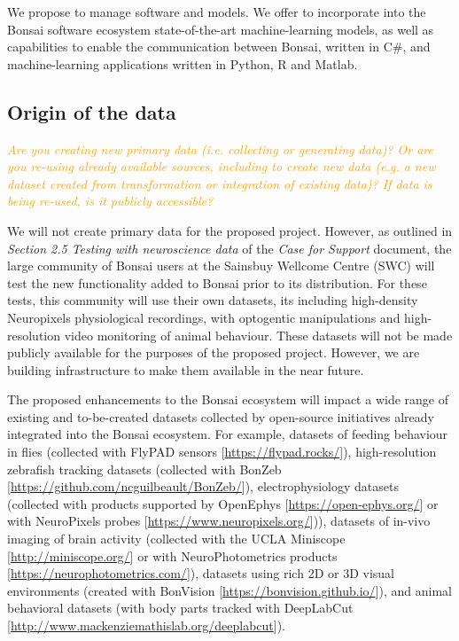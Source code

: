 \documentclass[a4paper,11pt]{article}
\renewcommand{\footnote}[1]{ [#1]}
\begin{document}
We propose to manage software and models. We offer to incorporate into the
Bonsai software ecosystem state-of-the-art machine-learning models, as well as
capabilities to enable the communication between Bonsai, written in C\#, and
machine-learning applications written in Python, R and Matlab.

\subsection{Origin of the data}

\textcolor{orange}{\textit{Are you creating new primary data (i.e. collecting or
generating data)? Or are you re-using already available sources, including to
create new data (e.g. a new dataset created from transformation or integration
of existing data)? If data is being re-used, is it publicly accessible?}}

We will not create primary data for the proposed project. However, as outlined
in \emph{Section 2.5 Testing with neuroscience data} of the \emph{Case for
Support} document, the large community of Bonsai users at the Sainsbuy Wellcome
Centre (SWC) will test the new functionality added to Bonsai prior to its
distribution. For these tests, this community will use their own datasets, its
including high-density Neuropixels physiological recordings, with optogentic
manipulations and high-resolution video monitoring of animal behaviour. These
datasets will not be made publicly available for the purposes of the proposed
project. However, we are building infrastructure to make them available in the
near future.

The proposed enhancements to the Bonsai ecosystem will impact a wide range of
existing and to-be-created datasets collected by open-source initiatives
already integrated into the Bonsai ecosystem. For example, datasets of feeding
behaviour in flies (collected with FlyPAD
sensors\footnote{\url{https://flypad.rocks/}}), high-resolution zebrafish
tracking datasets (collected with
BonZeb\footnote{\url{https://github.com/ncguilbeault/BonZeb/}}),
electrophysiology datasets (collected with products supported by
OpenEphys\footnote{\url{https://open-ephys.org/}} or with NeuroPixels
probes\footnote{\url{https://www.neuropixels.org/}})), datasets of in-vivo
imaging of brain activity (collected with the UCLA
Miniscope\footnote{\url{http://miniscope.org/}} or with NeuroPhotometrics
products\footnote{\url{https://neurophotometrics.com/}}), datasets using rich
2D or 3D visual environments (created with
BonVision\footnote{\url{https://bonvision.github.io/}}), and animal behavioral
datasets (with body parts tracked with
DeepLabCut\footnote{\url{http://www.mackenziemathislab.org/deeplabcut}}).
\end{document}
